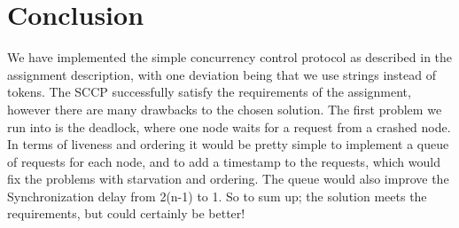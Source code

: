 \section{Conclusion}
\label{MutualExclusion_conclusion}
We have implemented the simple concurrency control protocol as described in the assignment description, with one deviation being that we use strings instead of tokens. The SCCP successfully satisfy the requirements of the assignment, however there are many drawbacks to the chosen solution. The first problem we run into is the deadlock, where one node waits for a request from a crashed node. In terms of liveness and ordering it would be pretty simple to implement a queue of requests for each node, and to add a timestamp to the requests, which would fix the problems with starvation and ordering. The queue would also improve the Synchronization delay from 2(n-1) to 1.
So to sum up; the solution meets the requirements, but could certainly be better!
